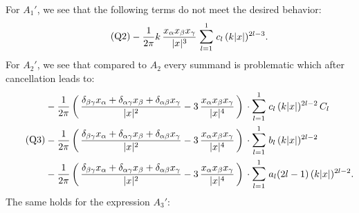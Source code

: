 For $A_1'$, we see that the following terms do not meet the desired behavior:
\begin{align}
  \label{eq:Q2}
  \tag{Q2}
  \begin{alignedat}{1}
  &- \frac{1}{2 \pi } k \, \frac{x_\alpha x_\beta x_\gamma}{|x|^3} \; \mathlarger{\sum}_{l = 1}^1 \; c_l \, (k|x|)^{2l - 3}. 
  \end{alignedat}
\end{align}
For $A_2'$, we see that compared to $A_2$ every summand is problematic which after cancellation leads to:
\begin{align}
  \label{eq:Q3}
  \tag{Q3}
  \begin{alignedat}{1}
  &- \frac{1}{2\pi} \, \bigg(\,\frac{\delta_{\beta\gamma} x_\alpha + \delta_{\alpha \gamma} x_\beta + \delta_{\alpha \beta} x_\gamma}{|x|^2} - 3\, \frac{x_\alpha x_\beta x_\gamma}{|x|^4} \, \bigg) 
  \,\cdot \mathlarger{\sum}_{l = 1}^1 \; c_l \, (k|x|)^{2l - 2} \, C_l \\
  &- \frac{1}{2\pi} \, \bigg(\, \frac{\delta_{\beta\gamma} x_\alpha + \delta_{\alpha \gamma} x_\beta + \delta_{\alpha \beta} x_\gamma}{|x|^2} - 3\, \frac{x_\alpha x_\beta x_\gamma}{|x|^4} \, \bigg) 
  \,\cdot \mathlarger{\sum}_{l = 1}^1 \; b_l \, (k|x|)^{2l - 2}  \\
  &- \frac{1}{2\pi} \, \bigg(\,\frac{\delta_{\beta\gamma} x_\alpha + \delta_{\alpha \gamma} x_\beta + \delta_{\alpha \beta} x_\gamma}{|x|^2} - 3\, \frac{x_\alpha x_\beta x_\gamma}{|x|^4} \, \bigg) 
  \,\cdot \mathlarger{\sum}_{l = 1}^1 \; a_l (2l - 1) \, (k|x|)^{2l - 2} .
  \end{alignedat}
\end{align}
The same holds for the expression $A_3'$:
